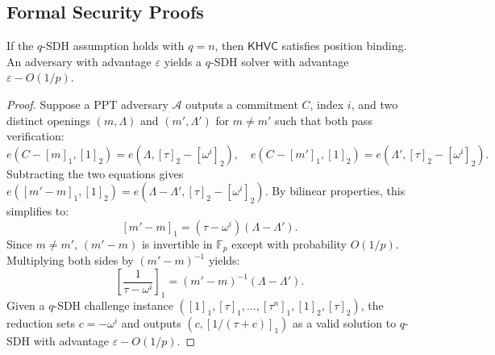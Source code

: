 \subsection{Formal Security Proofs}

\begin{theorem}
If the $q$-SDH assumption holds with $q = n$, then $\mathsf{KHVC}$ satisfies position binding. An adversary with advantage $\varepsilon$ yields a $q$-SDH solver with advantage $\varepsilon - O(1/p)$.
\end{theorem}
\begin{proof}
Suppose a PPT adversary $\mathcal{A}$ outputs a commitment $C$, index $i$, and two distinct openings $(m, \Lambda)$ and $(m', \Lambda')$ for $m \neq m'$ such that both pass verification:
\[
e(C - [m]_1, [1]_2) = e(\Lambda, [\tau]_2 - [\omega^i]_2), \quad
e(C - [m']_1, [1]_2) = e(\Lambda', [\tau]_2 - [\omega^i]_2).
\]
Subtracting the two equations gives $e([m' - m]_1, [1]_2) = e(\Lambda - \Lambda', [\tau]_2 - [\omega^i]_2)$. By bilinear properties, this simplifies to:
\[
[m' - m]_1 = (\tau - \omega^i) (\Lambda - \Lambda').
\]
Since $m \neq m'$, $(m' - m)$ is invertible in $\mathbb{F}_p$ except with probability $O(1/p)$. Multiplying both sides by $(m' - m)^{-1}$ yields:
\[
\left[ \frac{1}{\tau - \omega^i} \right]_1 = (m' - m)^{-1} (\Lambda - \Lambda').
\]
Given a $q$-SDH challenge instance $([1]_1, [\tau]_1, \dots, [\tau^n]_1, [1]_2, [\tau]_2)$, the reduction sets $c = -\omega^i$ and outputs $(c, [1/(\tau + c)]_1)$ as a valid solution to $q$-SDH with advantage $\varepsilon - O(1/p)$.
\end{proof}


